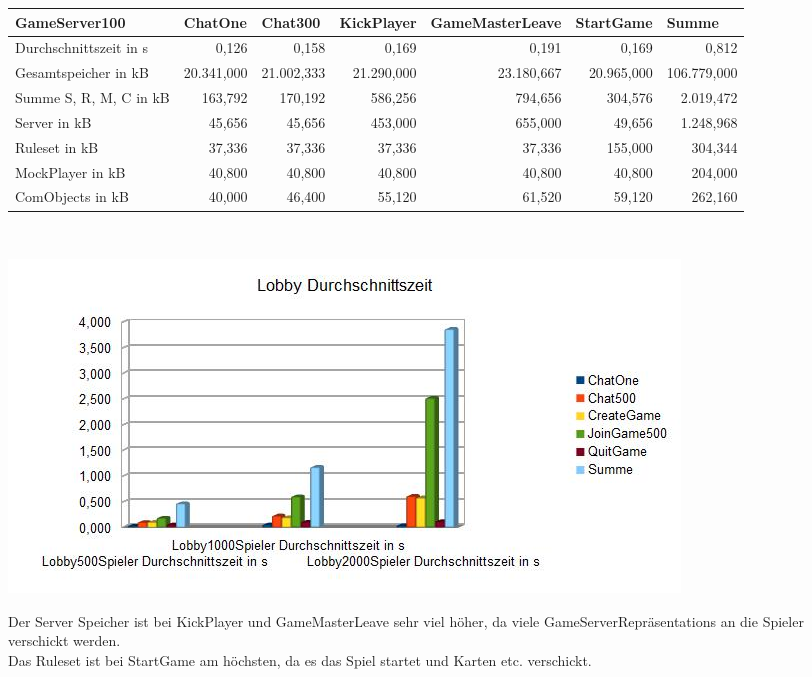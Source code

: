 \documentclass[a4paper]{article}
\begin{document}
\noindent
\begin{tabular}{|l|r|r|r|r|r|r|}
\hline
GameServer100 & \multicolumn{1}{l|}{ChatOne} & \multicolumn{1}{l|}{Chat300} & \multicolumn{1}{l|}{KickPlayer} & \multicolumn{1}{l|}{GameMasterLeave} & \multicolumn{1}{l|}{StartGame} & \multicolumn{1}{l|}{Summe} \\ \hline
Durchschnittszeit in s & 0,126 & 0,158 & 0,169 & 0,191 & 0,169 & 0,812 \\ \hline
Gesamtspeicher in kB & 20.341,000 & 21.002,333 & 21.290,000 & 23.180,667 & 20.965,000 & 106.779,000 \\ \hline
Summe S, R, M, C in kB & 163,792 & 170,192 & 586,256 & 794,656 & 304,576 & 2.019,472 \\ \hline
Server in kB & 45,656 & 45,656 & 453,000 & 655,000 & 49,656 & 1.248,968 \\ \hline
Ruleset in kB & 37,336 & 37,336 & 37,336 & 37,336 & 155,000 & 304,344 \\ \hline
MockPlayer in kB & 40,800 & 40,800 & 40,800 & 40,800 & 40,800 & 204,000 \\ \hline
ComObjects in kB & 40,000 & 46,400 & 55,120 & 61,520 & 59,120 & 262,160 \\ \hline
\end{tabular}
\ \\
\begin{center}
\includegraphics[scale=0.75]{4}
\end{center}
Der Server Speicher ist bei KickPlayer und GameMasterLeave sehr viel höher, da viele GameServerRepräsentations an die Spieler verschickt werden. \\
Das Ruleset ist bei StartGame am höchsten, da es das Spiel startet und Karten etc. verschickt.

\ \\
\ \\
\end{document}
